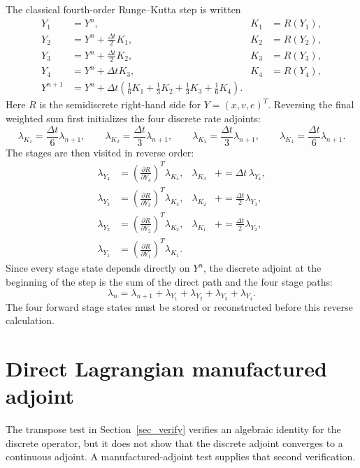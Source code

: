 \documentclass[11pt]{article}
\begin{document}
The classical fourth-order Runge--Kutta step is written
\begin{align}
 Y_1&=Y^n,
&K_1&=R(Y_1),\\
 Y_2&=Y^n+\frac{\Delta t}{2}K_1,
&K_2&=R(Y_2),\\
 Y_3&=Y^n+\frac{\Delta t}{2}K_2,
&K_3&=R(Y_3),\\
 Y_4&=Y^n+\Delta t K_3,
&K_4&=R(Y_4),\\
 Y^{n+1}&=Y^n+\Delta t\left(
 \frac16K_1+\frac13K_2+\frac13K_3+\frac16K_4\right).
\end{align}
Here $R$ is the semidiscrete right-hand side for $Y=(x,v,e)^T$.
Reversing the final weighted sum first initializes the four discrete rate adjoints:
\[
 \lambda_{K_1}=\frac{\Delta t}{6}\lambda_{n+1},\qquad
 \lambda_{K_2}=\frac{\Delta t}{3}\lambda_{n+1},\qquad
 \lambda_{K_3}=\frac{\Delta t}{3}\lambda_{n+1},\qquad
 \lambda_{K_4}=\frac{\Delta t}{6}\lambda_{n+1}.
\]
The stages are then visited in reverse order:
\begin{align}
 \lambda_{Y_4}
 &=\left(\frac{\partial R}{\partial Y_4}\right)^T\lambda_{K_4},
 &\lambda_{K_3}&\mathrel{+}=\Delta t\,\lambda_{Y_4},\\
 \lambda_{Y_3}
 &=\left(\frac{\partial R}{\partial Y_3}\right)^T\lambda_{K_3},
 &\lambda_{K_2}&\mathrel{+}=\frac{\Delta t}{2}\lambda_{Y_3},\\
 \lambda_{Y_2}
 &=\left(\frac{\partial R}{\partial Y_2}\right)^T\lambda_{K_2},
 &\lambda_{K_1}&\mathrel{+}=\frac{\Delta t}{2}\lambda_{Y_2},\\
 \lambda_{Y_1}
 &=\left(\frac{\partial R}{\partial Y_1}\right)^T\lambda_{K_1}.
\end{align}
Since every stage state depends directly on $Y^n$, the discrete adjoint at the
beginning of the step is the sum of the direct path and the four stage paths:
\[
 \boxed{
 \lambda_n=\lambda_{n+1}
 +\lambda_{Y_1}+\lambda_{Y_2}+\lambda_{Y_3}+\lambda_{Y_4}.}
\]
The four forward stage states must be stored or reconstructed before this
reverse calculation.

\section{Direct Lagrangian manufactured adjoint}

The transpose test in Section~\ref{sec_verify} verifies an algebraic identity
for the discrete operator, but it does not show that the discrete adjoint
converges to a continuous adjoint.  A manufactured-adjoint test supplies that
second verification.
\end{document}
